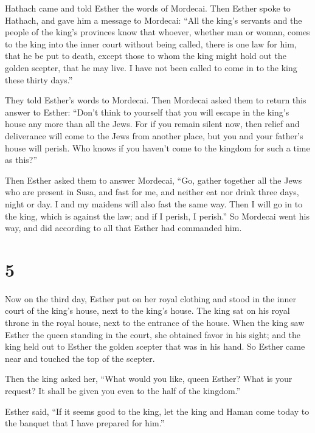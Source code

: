  Hathach came and told Esther the words of Mordecai.
 Then Esther spoke to Hathach, and gave him a message to
Mordecai:  ``All the king's servants and the people of the
king's provinces know that whoever, whether man or woman, comes to the
king into the inner court without being called, there is one law for
him, that he be put to death, except those to whom the king might hold
out the golden scepter, that he may live. I have not been called to come
in to the king these thirty days.''

 They told Esther's words to Mordecai.  Then
Mordecai asked them to return this answer to Esther: ``Don't think to
yourself that you will escape in the king's house any more than all the
Jews.  For if you remain silent now, then relief and
deliverance will come to the Jews from another place, but you and your
father's house will perish. Who knows if you haven't come to the kingdom
for such a time as this?''

 Then Esther asked them to answer Mordecai, 
``Go, gather together all the Jews who are present in Susa, and fast for
me, and neither eat nor drink three days, night or day. I and my maidens
will also fast the same way. Then I will go in to the king, which is
against the law; and if I perish, I perish.''  So Mordecai
went his way, and did according to all that Esther had commanded him.

\hypertarget{section-4}{%
\section{5}\label{section-4}}

 Now on the third day, Esther put on her royal clothing and
stood in the inner court of the king's house, next to the king's house.
The king sat on his royal throne in the royal house, next to the
entrance of the house.  When the king saw Esther the queen
standing in the court, she obtained favor in his sight; and the king
held out to Esther the golden scepter that was in his hand. So Esther
came near and touched the top of the scepter.

 Then the king asked her, ``What would you like, queen
Esther? What is your request? It shall be given you even to the half of
the kingdom.''

 Esther said, ``If it seems good to the king, let the king
and Haman come today to the banquet that I have prepared for him.''

